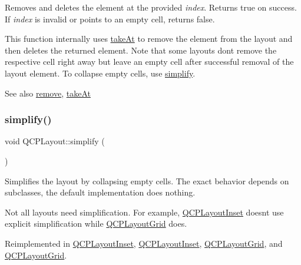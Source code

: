 Removes and deletes the element at the provided {\itshape index}. Returns true on success. If {\itshape index} is invalid or points to an empty cell, returns false.

This function internally uses \hyperlink{class_q_c_p_layout_a5a79621fa0a6eabb8b520cfc04fb601a}{take\+At} to remove the element from the layout and then deletes the returned element. Note that some layouts don\textquotesingle{}t remove the respective cell right away but leave an empty cell after successful removal of the layout element. To collapse empty cells, use \hyperlink{class_q_c_p_layout_a41e6ac049143866e8f8b4964efab01b2}{simplify}.

\begin{DoxySeeAlso}{See also}
\hyperlink{class_q_c_p_layout_a6c58f537d8086f352576ab7c5b15d0bc}{remove}, \hyperlink{class_q_c_p_layout_a5a79621fa0a6eabb8b520cfc04fb601a}{take\+At} 
\end{DoxySeeAlso}
\mbox{\label{class_q_c_p_layout_a41e6ac049143866e8f8b4964efab01b2}} 
\subsubsection{\texorpdfstring{simplify()}{simplify()}}
{\footnotesize\ttfamily void Q\+C\+P\+Layout\+::simplify (\begin{DoxyParamCaption}{ }\end{DoxyParamCaption})\hspace{0.3cm}{\ttfamily [virtual]}}

Simplifies the layout by collapsing empty cells. The exact behavior depends on subclasses, the default implementation does nothing.

Not all layouts need simplification. For example, \hyperlink{class_q_c_p_layout_inset}{Q\+C\+P\+Layout\+Inset} doesn\textquotesingle{}t use explicit simplification while \hyperlink{class_q_c_p_layout_grid}{Q\+C\+P\+Layout\+Grid} does. 

Reimplemented in \hyperlink{class_q_c_p_layout_inset_a18b7d508f0baa60cc5dcb1343cf7f32a}{Q\+C\+P\+Layout\+Inset}, \hyperlink{class_q_c_p_layout_inset_abdac9a04752751ea68c320016086a2e8}{Q\+C\+P\+Layout\+Inset}, \hyperlink{class_q_c_p_layout_grid_a38621ca7aa633b6a9a88617df7f08672}{Q\+C\+P\+Layout\+Grid}, and \hyperlink{class_q_c_p_layout_grid_a07841807e57ea5f6f0072250797defc0}{Q\+C\+P\+Layout\+Grid}.

